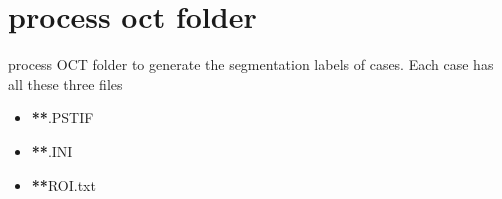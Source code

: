\documentclass[letterpaper,10pt,english]{sphinxmanual}
\begin{document}
\section{process oct folder}
\label{\detokenize{index:module-util.process_oct_folder}}\label{\detokenize{index:process-oct-folder}}
process OCT folder to generate the segmentation labels of cases. Each case has all these three files
\begin{itemize}
\item {} 
{\color{red}\bfseries{}**}.PSTIF

\item {} 
{\color{red}\bfseries{}**}.INI

\item {} 
{\color{red}\bfseries{}**}ROI.txt

\end{itemize}
\end{document}
